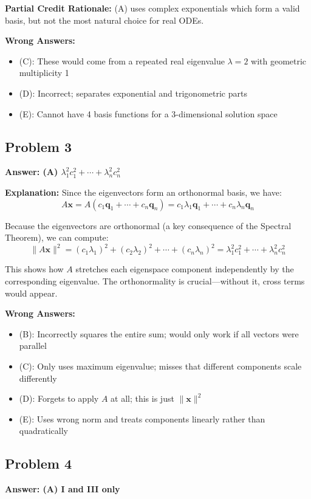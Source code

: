 \documentclass[12pt]{amsart}
\newcommand{\correct}[1]{{\color{correctgreen}\textbf{#1}}}
\begin{document}
\textbf{Partial Credit Rationale:} (A) uses complex exponentials which form a valid basis, but not the most natural choice for real ODEs.

\textbf{Wrong Answers:}
\begin{itemize}
\item (C): These would come from a repeated real eigenvalue $\lambda = 2$ with geometric multiplicity 1
\item (D): Incorrect; separates exponential and trigonometric parts
\item (E): Cannot have 4 basis functions for a 3-dimensional solution space
\end{itemize}

\subsection*{Problem 3}
\correct{Answer: (A) $\lambda_1^2 c_1^2 + \cdots + \lambda_n^2 c_n^2$}

\textbf{Explanation:} Since the eigenvectors form an orthonormal basis, we have:
$$A\mathbf{x} = A(c_1\mathbf{q}_1 + \cdots + c_n\mathbf{q}_n) = c_1\lambda_1\mathbf{q}_1 + \cdots + c_n\lambda_n\mathbf{q}_n$$

Because the eigenvectors are orthonormal (a key consequence of the Spectral Theorem), we can compute:
$$\|A\mathbf{x}\|^2 = (c_1\lambda_1)^2 + (c_2\lambda_2)^2 + \cdots + (c_n\lambda_n)^2 = \lambda_1^2 c_1^2 + \cdots + \lambda_n^2 c_n^2$$

This shows how $A$ stretches each eigenspace component independently by the corresponding eigenvalue. The orthonormality is crucial—without it, cross terms would appear.

\textbf{Wrong Answers:}
\begin{itemize}
\item (B): Incorrectly squares the entire sum; would only work if all vectors were parallel
\item (C): Only uses maximum eigenvalue; misses that different components scale differently
\item (D): Forgets to apply $A$ at all; this is just $\|\mathbf{x}\|^2$
\item (E): Uses wrong norm and treats components linearly rather than quadratically
\end{itemize}

\subsection*{Problem 4}
\correct{Answer: (A) I and III only}
\end{document}
